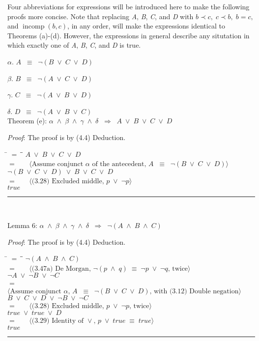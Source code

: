 \documentclass[12pt, fleqn, leqno]{article}
\newcommand{\lgap}{2pt}                             %
\newcommand{\mymathindent}{24pt}                    %
\newcommand{\equivs}{\ensuremath{\;\equiv\;}}       %
\newcommand{\equivss}{\ensuremath{\;\;\equiv\;\;}}  %
\newcommand{\lors}{\ensuremath{\;\lor\;}}           %
\newcommand{\lands}{\ensuremath{\;\land\;}}      %
\newcommand{\impl}{\ensuremath{\Rightarrow}}        %
\newcommand{\myqed}{\rule[-.23ex]{1.2ex}{2.0ex}}
\newcommand{\myqedtab}{\hspace{384pt}}              %
\newcommand{\Gll} {\langle}                         %
\newcommand{\Ggg} {\rangle}                         %
\newcommand{\Hint}[1]     {\ \ \ $\Gll              \mbox{#1} \Ggg$ }   %
\DeclareMathOperator{\incomp}{incomp}
\begin{document}
Four abbreviations for expressions will be introduced here to make the following proofs more concise. Note that replacing \textit{A}, \textit{B}, \textit{C}, and \textit{D} with $b \prec c,\; c \prec b,\; b = c,$ and $\incomp(b,c)$, in any order, will make the expressions identical to Theorems (a)-(d). However, the expressions in general describe any situtation in which exactly one of \textit{A}, \textit{B}, \textit{C}, and \textit{D} is true.

$\alpha$. $A \equivss \lnot (B \lors C \lors D)$

$\beta$.  $B \equivss \lnot (A \lors C \lors D)$

$\gamma$. $C \equivss \lnot (A \lors B \lors D)$

$\delta$. $D \equivss \lnot (A \lors B \lors C)$\\

Theorem (e): $\alpha \lands \beta \lands \gamma \lands \delta \;\;\impl\;\; A \lors B \lors C \lors D$

\textit{Proof}: The proof is by (4.4) Deduction.
\begin{tabbing}
\hspace{\mymathindent} \= $= \;$ \= \myqedtab \= \kill
	\> \>  $A \lors B \lors C \lors D$\\
	\> $=$  \>  \Hint{Assume conjunct $\alpha$ of the antecedent, $A \equivss \lnot (B \lors C \lors D)$}\\[\lgap]
	\> \>   $ \lnot (B \lors C \lors D) \lors B \lors C \lors D$\\
	\> $=$  \>  \Hint{(3.28) Excluded middle, $p \lors  \lnot p$}\\[\lgap]
	\> \>   $true$ \quad \myqed\\
\end{tabbing}

Lemma 6: $\alpha \lands \beta \lands \gamma \lands \delta \;\;\impl\;\; \lnot (A \lands B \lands C)$

\textit{Proof}: The proof is by (4.4) Deduction.
\begin{tabbing}
\hspace{\mymathindent} \= $= \;$ \= \myqedtab \= \kill
	\> \>  $\lnot (A \lands B \lands C)$\\
	\> $=$  \>  \Hint{(3.47a) De Morgan, $\lnot (p \lands q) \equivs \lnot p \lors \lnot q$, twice}\\[\lgap]
	\> \>   $\lnot A \lors \lnot B \lors \lnot C$\\
	\> $=$  \>  \Hint{Assume conjunct $\alpha$, $A \equivss \lnot (B \lors C \lors D)$, with (3.12) Double negation}\\[\lgap]
	\> \>   $B \lors C \lors D \lors \lnot B \lors \lnot C$\\
	\> $=$  \>  \Hint{(3.28) Excluded middle, $p \lors \lnot p$, twice}\\[\lgap]
	\> \>   $true \lors true \lors D$\\
	\> $=$  \>  \Hint{(3.29) Identity of $\lor$, $p \lors true \equivs true$}\\[\lgap]
	\> \>   $true$ \quad \myqed\\
\end{tabbing}
\end{document}
